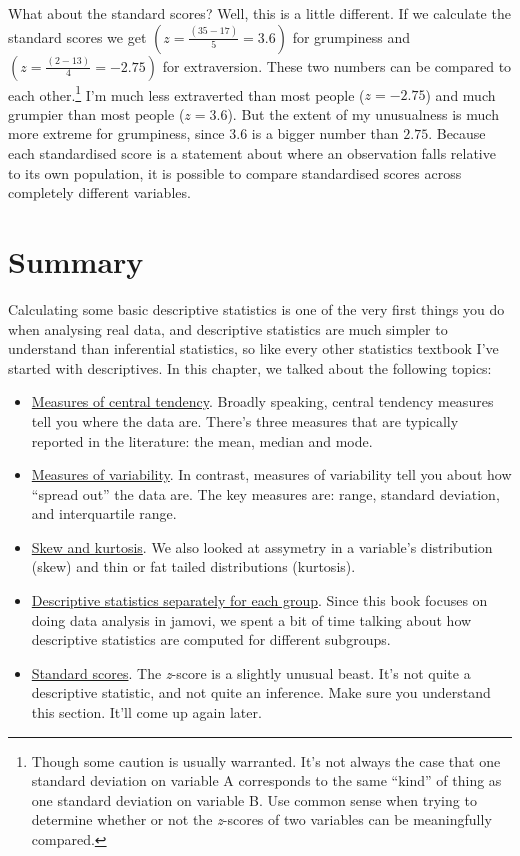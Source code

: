 \documentclass[
  a4paper,
]{book}
\providecommand{\tightlist}{%
  \setlength{\itemsep}{0pt}\setlength{\parskip}{0pt}}\usepackage{longtable,booktabs,array}
\begin{document}
What about the standard scores? Well, this is a little different. If we
calculate the standard scores we get \((z = \frac{(35-17)}{5}=3.6)\) for
grumpiness and \((z = \frac{(2-13)}{4}=-2.75)\) for extraversion. These
two numbers can be compared to each other.\footnote{Though some caution
  is usually warranted. It's not always the case that one standard
  deviation on variable A corresponds to the same ``kind'' of thing as
  one standard deviation on variable B. Use common sense when trying to
  determine whether or not the \emph{z}-scores of two variables can be
  meaningfully compared.} I'm much less extraverted than most people
(\(z = -2.75\)) and much grumpier than most people (\(z=3.6\)). But the
extent of my unusualness is much more extreme for grumpiness, since
\(3.6\) is a bigger number than \(2.75\). Because each standardised
score is a statement about where an observation falls relative to its
own population, it is possible to compare standardised scores across
completely different variables.

\hypertarget{summary-2}{%
\section{Summary}\label{summary-2}}

Calculating some basic descriptive statistics is one of the very first
things you do when analysing real data, and descriptive statistics are
much simpler to understand than inferential statistics, so like every
other statistics textbook I've started with descriptives. In this
chapter, we talked about the following topics:

\begin{itemize}
\tightlist
\item
  \protect\hyperlink{measures-of-central-tendency}{Measures of central
  tendency}. Broadly speaking, central tendency measures tell you where
  the data are. There's three measures that are typically reported in
  the literature: the mean, median and mode.
\item
  \protect\hyperlink{sec-Measures-of-variability}{Measures of
  variability}. In contrast, measures of variability tell you about how
  ``spread out'' the data are. The key measures are: range, standard
  deviation, and interquartile range.
\item
  \protect\hyperlink{skew-and-kurtosis}{Skew and kurtosis}. We also
  looked at assymetry in a variable's distribution (skew) and thin or
  fat tailed distributions (kurtosis).
\item
  \protect\hyperlink{descriptive-statistics-separately-for-each-group}{Descriptive
  statistics separately for each group}. Since this book focuses on
  doing data analysis in jamovi, we spent a bit of time talking about
  how descriptive statistics are computed for different subgroups.
\item
  \protect\hyperlink{sec-Standard-scores}{Standard scores}. The
  \emph{z}-score is a slightly unusual beast. It's not quite a
  descriptive statistic, and not quite an inference. Make sure you
  understand this section. It'll come up again later.
\end{itemize}
\end{document}
